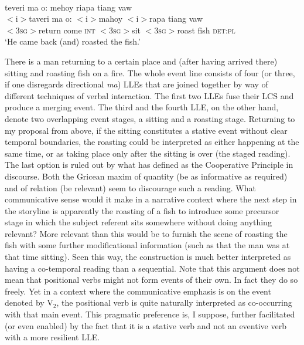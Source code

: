 \ea \label{mehoy_2}
\\
\glll teveri ma o: mehoy riapa tiang vaw \\
$<$i$>$taveri ma o: $<$i$>$mahoy $<$i$>$rapa tiang vaw \\
$<$3\textsc{sg}$>$return come \textsc{int} $<$3\textsc{sg}$>$sit $<$3\textsc{sg}$>$roast fish \textsc{det}:\textsc{pl}\\
\glft `He came back (and) roasted the fish.' \\ 
\z

There is a man returning to a certain place and (after having arrived there) sitting and roasting fish on a fire. The whole event line consists of four (or three, if one disregards directional \textit{ma}) LLEs that are joined together by way of different techniques of verbal interaction. The first two LLEs fuse their LCS and produce a merging event. The third and the fourth LLE, on the other hand, denote two overlapping event stages, a sitting and a roasting stage. Returning to my proposal from above, if the sitting constitutes a stative event without clear temporal boundaries, the roasting could be interpreted as either happening at the same time, or as taking place only after the sitting is over (the staged reading). The last option is ruled out by what \citet{grice1989studies} has defined as the Cooperative Principle in discourse. Both the Gricean maxim of quantity (be as informative as required) and of relation (be relevant) seem to discourage such a reading. What communicative sense would it make in a narrative context where the next step in the storyline is apparently the roasting of a fish to introduce some precursor stage in which the subject referent sits somewhere without doing anything relevant? More relevant than this would be to furnish the scene of roasting the fish with some further modificational information (such as that the man was at that time sitting). Seen this way, the construction is much better interpreted as having a co-temporal reading than a sequential. Note that this argument does not mean that positional verbs might not form events of their own. In fact they do so freely. Yet in a context where the communicative emphasis is on the event denoted by V$_2$, the positional verb is quite naturally interpreted as co-occurring with that main event. This pragmatic preference is, I suppose, further facilitated (or even enabled) by the fact that it is a stative verb and not an eventive verb with a more resilient LLE. 

